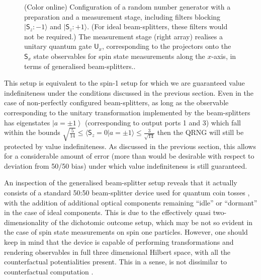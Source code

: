 \documentclass[%
 preprint,
 showpacs,
 showkeys,
 amsmath,
 amssymb,
 aps,
 pra,
 ]{revtex4-1}
\theoremstyle{definition}
\newcommand{\ket}[1]{\left| #1 \right>}
\newcommand{\iprod}[2]{\langle #1 | #2 \rangle}
\begin{document}
\begin{figure}[ht]
\begin{center}
\begin{picture}
\end{picture}
\end{center}
\caption{(Color online) Configuration of a random number generator
with a preparation and a measurement stage, including filters blocking
$\vert \textsf{S}_z : -1 \rangle$
and
$\vert \textsf{S}_z : +1 \rangle$.
(For ideal beam-splitters, these filters would not be required.)
The measurement stage (right array) realises a unitary quantum gate $\textsf{U}_x$, corresponding  to the projectors onto
the $\textsf{S}_x$ state observables for spin state measurements along the $x$-axis,
in terms of generalised beam-splitters..
\label{2012-incomput-proofsC-f1}}
\end{figure}

This setup is equivalent to the spin-1 setup for which we are guaranteed value indefiniteness under the conditions discussed in the previous section.
Even in the case of non-perfectly configured beam-splitters, as long as the observable corresponding to the unitary transformation implemented by the beam-splitters has eigenstates $\ket{a=\pm 1}$ (corresponding to output ports 1 and 3) which fall within the bounds $\sqrt{\frac{5}{14}} \le \iprod{\textsf{S}_z=0}{a=\pm 1}\le \frac{3}{\sqrt{14}}$ then the QRNG will still be protected by value indefiniteness.
As discussed in the previous section, this allows for a considerable amount of error (more than would be desirable with respect to deviation from 50/50 bias) under which value indefiniteness is still guaranteed.

An inspection of the generalised beam-splitter setup reveals that it actually consists of a standard 50:50 beam-splitter device
used for quantum coin tosses
\cite{svozil-qct,rarity-94,zeilinger:qct,stefanov-2000,0256-307X-21-10-027,wang:056107,fiorentino:032334,svozil-2009-howto,10.1038/nature09008},
with the addition of additional optical components remaining ``idle'' or ``dormant''
in the case of ideal components.
This is due to the effectively quasi two-dimensionality of the dichotomic outcome setup,
which may be not so evident in the case of spin state measurements on spin one particles.
However, one should keep in mind that
the device is capable of performing transformations and rendering observables in full three dimensional Hilbert space,
with all the counterfactual potentialities present.
This in a sense, is not dissimilar to counterfactual computation  \cite{elitzur-vaidman:1}.
\end{document}

